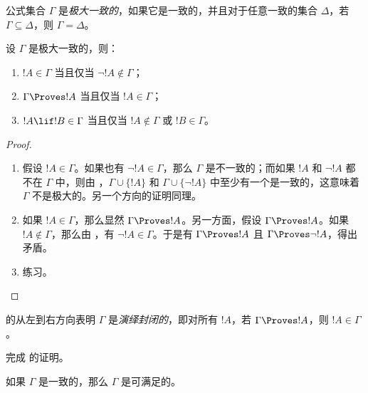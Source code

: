 \documentclass[../../../include/open-logic-section]{subfiles}
\begin{document}


\begin{defn}
公式集合 $\Gamma$ 是\emph{极大一致的}，如果它是一致的，并且对于任意一致的集合 $\Delta$，若 $\Gamma
\subseteq \Delta$，则 $\Gamma = \Delta$。
\end{defn}

\begin{lem}[真值引理]
设 $\Gamma$ 是极大一致的，则：
\begin{enumerate}
\item {} $!A \in \Gamma$ 当且仅当 $\lnot !A
  \notin \Gamma$；
\item {} $\Gamma \Proves !A$ 当且仅当 $!A \in \Gamma$；
\item {} $!A \lif !B \in \Gamma$ 当且仅当
  $!A \notin \Gamma$ 或 $!B \in \Gamma$。
\end{enumerate}
\end{lem}

\begin{proof}
\begin{enumerate}
\item 假设 $!A \in \Gamma$。如果也有 $\lnot !A \in \Gamma$，那么
  $\Gamma$ 是不一致的；而如果 $!A$ 和 $\lnot!A$ 都不在 $\Gamma$ 中，则由 ，$\Gamma\cup\{!A\}$ 和
  $\Gamma \cup \{\lnot !A\}$ 中至少有一个是一致的，这意味着 $\Gamma$
  不是极大的。另一个方向的证明同理。
\item 如果 $!A \in \Gamma$，那么显然 $\Gamma \Proves !A$。另一方面，假设 $\Gamma \Proves !A$。如果 $!A \notin \Gamma$，那么由 ，有 $\lnot !A \in \Gamma$。于是有 $\Gamma \Proves
  !A$ 且 $\Gamma \Proves \lnot !A$，得出矛盾。
\item 练习。
\end{enumerate}
\end{proof}

 的从左到右方向表明 $\Gamma$ 是\emph{演绎封闭的}，即对所有 $!A$，若 $\Gamma \Proves !A$，则 $!A
\in \Gamma$。

\begin{prob}
  完成  的证明。
\end{prob}

\begin{thm}[完备性定理]
如果 $\Gamma$ 是一致的，那么 $\Gamma$ 是可满足的。
\end{thm}
\end{document}
